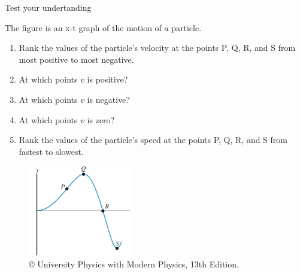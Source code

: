 \documentclass[]{beamer}
\begin{document}
\begin{frame}
Test your undertanding
\vspace{3mm}

The figure is an x-t graph of the motion of a particle.
   
 \begin{enumerate}
\item Rank the values of the particle’s velocity at the
points P, Q, R, and S from most positive to most negative.
\item At which points $v$ is positive? 
\item  At which points $v$ is negative? 
\item At which points $v$ is zero? 
\item Rank the values of the particle’s speed at the points P, Q, R, and S from fastest 
to slowest.

\end{enumerate}
   
   \begin{figure}[h!]   
   \includegraphics[width=0.4\textwidth]{images/10.jpg}
   \caption{ {\tiny © University Physics 
   with Modern Physics, 13th Edition.} }
\end{figure}

 \end{frame}



\end{document}
